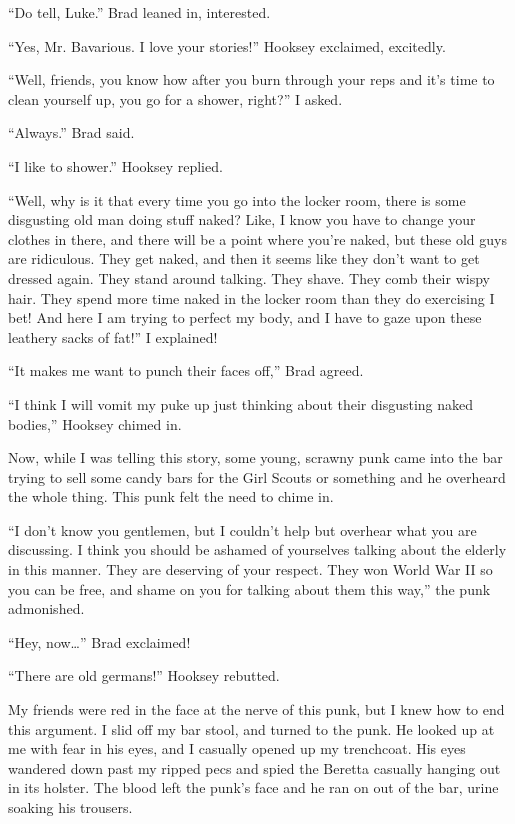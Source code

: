 ``Do tell, Luke.'' Brad leaned in, interested.

``Yes, Mr. Bavarious. I love your stories!'' Hooksey exclaimed,
excitedly.



``Well, friends, you know how after you burn through your reps and
it's time to clean yourself up, you go for a shower, right?'' I
asked.



``Always.'' Brad said.

``I like to shower.'' Hooksey replied.



``Well, why is it that every time you go into the locker room, there
is some disgusting old man doing stuff naked? Like, I know you have
to change your clothes in there, and there will be a point where
you're naked, but these old guys are ridiculous. They get naked,
and then it seems like they don't want to get dressed again. They
stand around talking. They shave. They comb their wispy hair. They
spend more time naked in the locker room than they do exercising I
bet! And here I am trying to perfect my body, and I have to gaze
upon these leathery sacks of fat!'' I explained!



``It makes me want to punch their faces off,'' Brad agreed.

``I think I will vomit my puke up just thinking about their
disgusting naked bodies,'' Hooksey chimed in.



Now, while I was telling this story, some young, scrawny punk came
into the bar trying to sell some candy bars for the Girl Scouts or
something and he overheard the whole thing. This punk felt the need
to chime in.



``I don't know you gentlemen, but I couldn't help but overhear what
you are discussing. I think you should be ashamed of yourselves
talking about the elderly in this manner. They are deserving of
your respect. They won World War II so you can be free, and shame
on you for talking about them this way,'' the punk admonished.



``Hey, now{\ldots}'' Brad exclaimed!

``There are old germans!'' Hooksey rebutted.



My friends were red in the face at the nerve of this punk, but I
knew how to end this argument. I slid off my bar stool, and turned
to the punk. He looked up at me with fear in his eyes, and I
casually opened up my trenchcoat. His eyes wandered down past my
ripped pecs and spied the Beretta casually hanging out in its
holster. The blood left the punk's face and he ran on out of the
bar, urine soaking his trousers.



